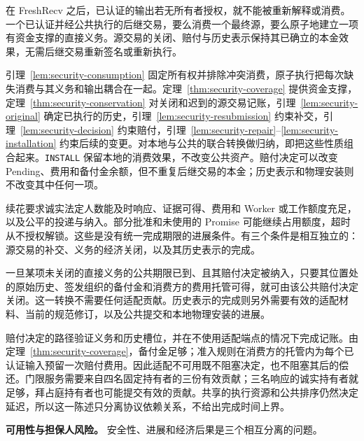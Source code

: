 \begin{theorem}[受保护的续花]
\label{thm:security-continuation}
在 FreshRecv 之后，已认证的输出若无所有者授权，就不能被重新解释或消费。一个已认证并经公共执行的后继交易，要么消费一个最终源，要么原子地建立一项有资金支撑的直接义务。源交易的关闭、赔付与历史表示保持其已确立的本金效果，无需后继交易重新签名或重新执行。
\end{theorem}
\begin{IEEEproof}
引理~\ref{lem:security-consumption} 固定所有权并排除冲突消费，原子执行把每次缺失消费与其义务和输出耦合在一起。定理~\ref{thm:security-coverage} 提供资金支撑，定理~\ref{thm:security-conservation} 对关闭和迟到的源交易记账，引理~\ref{lem:security-original} 确定已执行的历史，引理~\ref{lem:security-resubmission} 约束补交，引理~\ref{lem:security-decision} 约束赔付，引理~\ref{lem:security-repair}--\ref{lem:security-installation} 约束后续的变更。对本地与公共的联合转换做归纳，即把这些性质组合起来。\texttt{INSTALL} 保留本地的消费效果，不改变公共资产。赔付决定可以改变 Pending、费用和备付金余额，但不重复后继交易的本金；历史表示和物理安装则不改变其中任何一项。
\end{IEEEproof}

续花要求诚实法定人数能及时响应、证据可得、费用和 Worker 或工作额度充足，以及公平的投递与纳入。部分批准和未使用的 Promise 可能继续占用额度，超时从不授权解锁。这些是没有统一完成期限的进展条件。有三个条件是相互独立的：源交易的补交、义务的经济关闭，以及其历史表示的完成。

\begin{lemma}[经济关闭无需等待适配]
\label{lem:security-closure}
一旦某项未关闭的直接义务的公共期限已到、且其赔付决定被纳入，只要其位置处的原始历史、签发组织的备付金和消费方的费用托管可得，就可由该公共赔付决定关闭。这一转换不需要任何适配贡献。历史表示的完成则另外需要有效的适配材料、当前的规范修订，以及公共提交和本地物理安装的进展。
\end{lemma}
\begin{IEEEproof}
赔付决定的路径验证义务和历史槽位，并在不使用适配端点的情况下完成记账。由定理~\ref{thm:security-coverage}，备付金足够；准入规则在消费方的托管内为每个已认证输入预留一次赔付费用。因此适配不可用既不阻塞决定，也不阻塞其后的偿还。门限服务需要来自四名固定持有者的三份有效贡献；三名响应的诚实持有者就足够，拜占庭持有者也可能提交有效的贡献。共享的执行资源和公共排序仍然决定延迟，所以这一陈述只分离协议依赖关系，不给出完成时间上界。
\end{IEEEproof}

\noindent\textbf{可用性与担保人风险。}
安全性、进展和经济后果是三个相互分离的问题。

